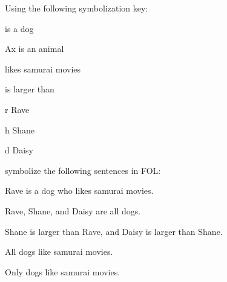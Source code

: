 	

	
		\begin{practiceproblems}
			
			
			\problempart 
			Using the following symbolization key:
			\begin{ekey}
				\item[\atom{D}{x}]  is a dog
				\item[Ax]  is an animal
				\item[\atom{S}{x}]  likes samurai movies
				\item[\atom{L}{xy}]  is larger than 
				\item[r] Rave
				\item[h] Shane
				\item[d] Daisy
			\end{ekey}
			symbolize the following sentences in FOL:
			\begin{problemslist}
				\item Rave is a dog who likes samurai movies.
				\item[] 
				\item Rave, Shane, and Daisy are all dogs.
				\item[] 
				\item Shane is larger than Rave, and Daisy is larger than Shane.
				\item[] 
				\item All dogs like samurai movies.
				\item[] 
				\item Only dogs like samurai movies.
				\item[] 

\end{problemslist}
\end{practiceproblems}
